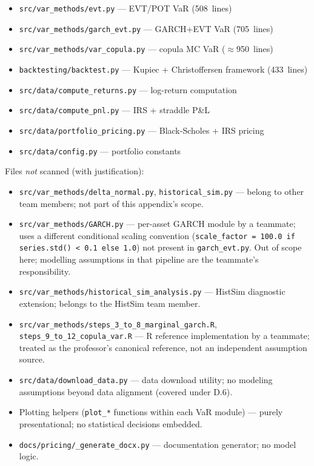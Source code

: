 \documentclass[11pt,a4paper]{article}
\newcommand{\code}[1]{\texttt{#1}}
\begin{document}
\begin{itemize}
  \item \code{src/var\_methods/evt.py} --- EVT/POT VaR (508~lines)
  \item \code{src/var\_methods/garch\_evt.py} --- GARCH+EVT VaR (705~lines)
  \item \code{src/var\_methods/var\_copula.py} --- copula MC VaR ($\approx$950~lines)
  \item \code{backtesting/backtest.py} --- Kupiec + Christoffersen framework (433~lines)
  \item \code{src/data/compute\_returns.py} --- log-return computation
  \item \code{src/data/compute\_pnl.py} --- IRS + straddle P\&L
  \item \code{src/data/portfolio\_pricing.py} --- Black-Scholes + IRS pricing
  \item \code{src/data/config.py} --- portfolio constants
\end{itemize}

Files \emph{not} scanned (with justification):
\begin{itemize}
  \item \code{src/var\_methods/delta\_normal.py}, \code{historical\_sim.py} ---
    belong to other team members; not part of this appendix's scope.
  \item \code{src/var\_methods/GARCH.py} --- per-asset GARCH module by a
    teammate; uses a different conditional scaling convention
    (\code{scale\_factor = 100.0 if series.std() < 0.1 else 1.0}) not
    present in \code{garch\_evt.py}. Out of scope here; modelling assumptions
    in that pipeline are the teammate's responsibility.
  \item \code{src/var\_methods/historical\_sim\_analysis.py} --- HistSim
    diagnostic extension; belongs to the HistSim team member.
  \item \code{src/var\_methods/steps\_3\_to\_8\_marginal\_garch.R},
    \code{steps\_9\_to\_12\_copula\_var.R} --- R reference implementation by
    a teammate; treated as the professor's canonical reference, not an
    independent assumption source.
  \item \code{src/data/download\_data.py} --- data download utility; no
    modeling assumptions beyond data alignment (covered under D.6).
  \item Plotting helpers (\code{plot\_*} functions within each VaR module) ---
    purely presentational; no statistical decisions embedded.
  \item \code{docs/pricing/\_generate\_docx.py} --- documentation generator; no model logic.
\end{itemize}
\end{document}
